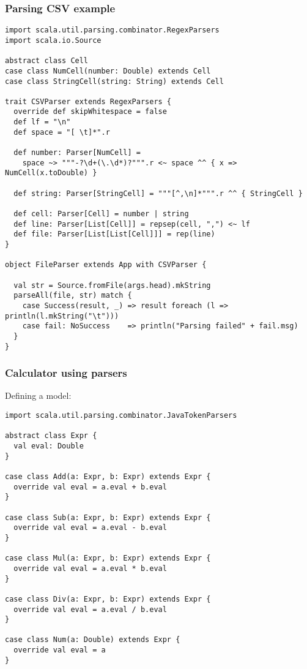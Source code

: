 \documentclass[t]{beamer}
\begin{document}
\begin{frame}[fragile]
\frametitle{Parsing CSV example}
\begin{lstlisting}
import scala.util.parsing.combinator.RegexParsers
import scala.io.Source

abstract class Cell
case class NumCell(number: Double) extends Cell
case class StringCell(string: String) extends Cell

trait CSVParser extends RegexParsers {
  override def skipWhitespace = false
  def lf = "\n"
  def space = "[ \t]*".r

  def number: Parser[NumCell] =
    space ~> """-?\d+(\.\d*)?""".r <~ space ^^ { x => NumCell(x.toDouble) }

  def string: Parser[StringCell] = """[^,\n]*""".r ^^ { StringCell }

  def cell: Parser[Cell] = number | string
  def line: Parser[List[Cell]] = repsep(cell, ",") <~ lf
  def file: Parser[List[List[Cell]]] = rep(line)
}

object FileParser extends App with CSVParser {

  val str = Source.fromFile(args.head).mkString
  parseAll(file, str) match {
    case Success(result, _) => result foreach (l => println(l.mkString("\t")))
    case fail: NoSuccess    => println("Parsing failed" + fail.msg)
  }
}
\end{lstlisting}
\end{frame}

\begin{frame}[fragile]
\frametitle{Calculator using parsers}
Defining a model:
\begin{lstlisting}[name=calc]
import scala.util.parsing.combinator.JavaTokenParsers

abstract class Expr {
  val eval: Double
}

case class Add(a: Expr, b: Expr) extends Expr {
  override val eval = a.eval + b.eval
}

case class Sub(a: Expr, b: Expr) extends Expr {
  override val eval = a.eval - b.eval
}

case class Mul(a: Expr, b: Expr) extends Expr {
  override val eval = a.eval * b.eval
}

case class Div(a: Expr, b: Expr) extends Expr {
  override val eval = a.eval / b.eval
}

case class Num(a: Double) extends Expr {
  override val eval = a
}
\end{lstlisting}
\end{frame}
\end{document}
